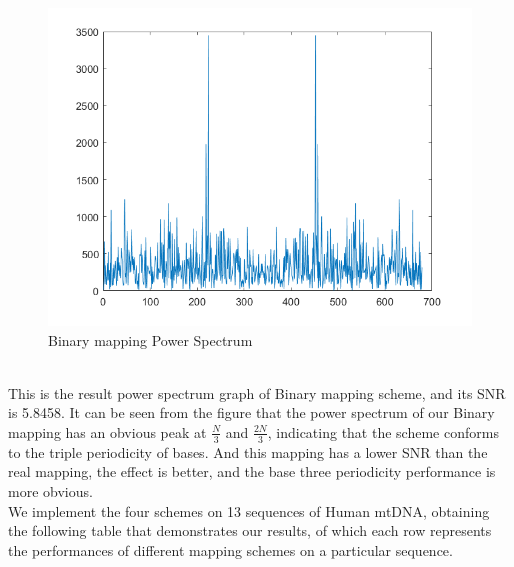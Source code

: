\documentclass[conference]{IEEEtran}
\begin{document}
\begin{figure}[H]
    \centering
    \includegraphics[width=\linewidth]{binaryp.png}
    \caption{Binary mapping Power Spectrum}
    \label{binaryp}
\end{figure}
~\\ \indent This is the result power spectrum graph of Binary mapping scheme, and its SNR is 5.8458. It can be seen from the figure that the power spectrum of our Binary mapping has an obvious peak at $\frac{N}{3}$ and $\frac{2N}{3}$, indicating that the scheme conforms to the triple periodicity of bases. And this mapping has a lower SNR than the real mapping, the effect is better, and the base three periodicity performance is more obvious.
~\\ \indent We implement the four schemes on 13 sequences of Human mtDNA, obtaining the following table that demonstrates our results, of which each row represents the performances of different mapping schemes on a particular sequence.
\end{document}
